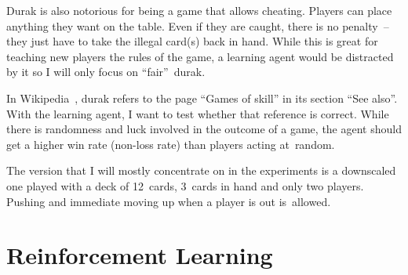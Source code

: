 \documentclass[a4paper,titlepage]{article}
\begin{document}
Durak is also notorious for being a game that allows cheating. Players can place anything they want on the table. Even if they are caught, there is no penalty~-- they just have to take the illegal card(s) back in hand. While this is great for teaching new players the rules of the game, a learning agent would be distracted by it so I will only focus on ``fair''~durak.

In Wikipedia~\cite{wikidurak}, durak refers to the page ``Games of skill'' in its section ``See also''. With the learning agent, I want to test whether that reference is correct. While there is randomness and luck involved in the outcome of a game, the agent should get a higher win rate (non-loss rate) than players acting at~random. \medskip

The version that I will mostly concentrate on in the experiments is a downscaled one played with a deck of 12~cards, 3~cards in hand and only two players.
Pushing and immediate moving up when a player is out is~allowed.

\newpage

\section{Reinforcement Learning}
\end{document}
